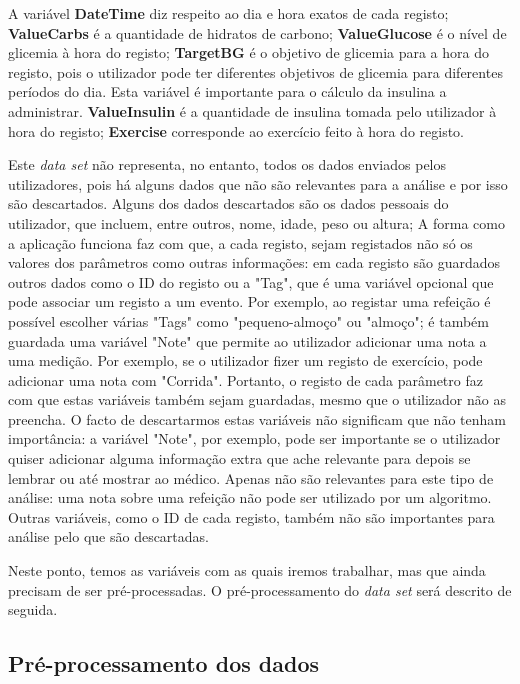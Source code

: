 A variável \textbf{DateTime} diz respeito ao dia e hora exatos de cada registo;
\textbf{Value\textunderscore Carbs} é a quantidade de hidratos de carbono;
\textbf{Value\textunderscore Glucose} é o nível de glicemia à hora do registo;
\textbf{Target\textunderscore BG} é o objetivo de glicemia para a hora do registo, pois o utilizador pode ter diferentes objetivos de glicemia para diferentes períodos do dia. Esta variável é importante para o cálculo da insulina a administrar.
\textbf{Value\textunderscore Insulin} é a quantidade de insulina tomada pelo utilizador à hora do registo;
\textbf{Exercise} corresponde ao exercício feito à hora do registo.\newline

Este \textit{data set} não representa, no entanto, todos os dados enviados pelos utilizadores, pois há alguns dados que não são relevantes para a análise e por isso são descartados. Alguns dos dados descartados são os dados pessoais do utilizador, que incluem, entre outros, nome, idade, peso ou altura; A forma como a aplicação funciona faz com que, a cada registo, sejam registados não só os valores dos parâmetros como outras informações: em cada registo são guardados outros dados como o ID do registo ou a "Tag", que é uma variável opcional que pode associar um registo a um evento. Por exemplo, ao registar uma refeição é possível escolher várias "Tags" como "pequeno-almoço" ou "almoço"; é também guardada uma variável "Note" que permite ao utilizador adicionar uma nota a uma medição. Por exemplo, se o utilizador fizer um registo de exercício, pode adicionar uma nota com "Corrida". Portanto, o registo de cada parâmetro faz com que estas variáveis também sejam guardadas, mesmo que o utilizador não as preencha. O facto de descartarmos estas variáveis não significam que não tenham importância: a variável "Note", por exemplo, pode ser importante se o utilizador quiser adicionar alguma informação extra que ache relevante para depois se lembrar ou até mostrar ao médico. Apenas não são relevantes para este tipo de análise: uma nota sobre uma refeição não pode ser utilizado por um algoritmo. Outras variáveis, como o ID de cada registo, também não são importantes para análise pelo que são descartadas. 

Neste ponto, temos as variáveis com as quais iremos trabalhar, mas que ainda precisam de ser pré-processadas. O pré-processamento do \textit{data set} será descrito de seguida.

\subsection{Pré-processamento dos dados}

